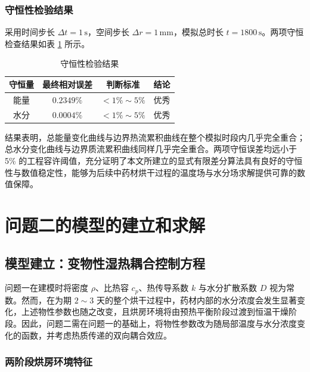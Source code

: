 \documentclass[withoutpreface,bwprint]{cumcm_thesis}
\begin{document}
\subsubsection{守恒性检验结果}



采用时间步长 \(\Delta t = 1\,\text{s}\)，空间步长 \(\Delta r = 1\,\text{mm}\)，模拟总时长 \(t = 1800\,\text{s}\)。两项守恒检查结果如表 \ref{tab:conservation_check} 所示。

\begin{table}[H]
\centering
\caption{守恒性检验结果}
\label{tab:conservation_check}
\begin{tabular}{cccc}
\toprule
守恒量 & 最终相对误差 & 判断标准 & 结论 \\
\midrule
能量 & \(0.2349\%\) & \(< 1\% \sim 5\%\) & 优秀 \\
水分 & \(0.0004\%\) & \(< 1\% \sim 5\%\) & 优秀 \\
\bottomrule
\end{tabular}
\end{table}

结果表明，总能量变化曲线与边界热流累积曲线在整个模拟时段内几乎完全重合；总水分变化曲线与边界质流累积曲线同样几乎完全重合。两项守恒误差均远小于 5\% 的工程容许阈值，充分证明了本文所建立的显式有限差分算法具有良好的守恒性与数值稳定性，能够为后续中药材烘干过程的温度场与水分场求解提供可靠的数值保障。


\newpage
\section{问题二的模型的建立和求解}

\subsection{模型建立：变物性湿热耦合控制方程}

问题一在建模时将密度 \(\rho\)、比热容 \(c_p\)、热传导系数 \(k\) 与水分扩散系数 \(D\) 视为常数。然而，在为期 \(2\sim3\) 天的整个烘干过程中，药材内部的水分浓度会发生显著变化，上述物性参数也随之改变，且烘房环境将由预热平衡阶段过渡到恒温干燥阶段。因此，问题二需在问题一的基础上，将物性参数改为随局部温度与水分浓度变化的函数，并考虑热质传递的双向耦合效应。

\subsubsection{两阶段烘房环境特征}
\end{document}

